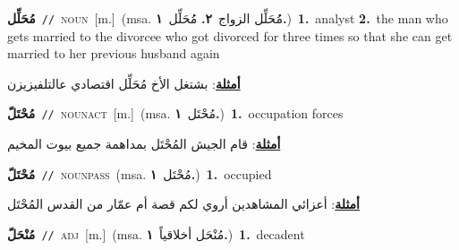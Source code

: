 \documentclass[10pt,a4paper,twoside]{article} %
\begin{document}
\begin{multicols}{2}
{\setlength\topsep{0pt}\textbf{\foreignlanguage{arabic}{مُحَلِّل}}\ {\color{gray}\texttt{//}\color{black}}\ \textsc{noun}\ [m.]\ \color{gray}(msa. \foreignlanguage{arabic}{مُُحَلِّل الزواج}~\foreignlanguage{arabic}{\textbf{٢.}}  \foreignlanguage{arabic}{مُُحَلِّل}~\foreignlanguage{arabic}{\textbf{١.}})\color{black}\ \textbf{1.}~analyst  \textbf{2.}~the man who gets married to the divorcee who got divorced for three times so that she can get married to her previous husband again\  \begin{flushright}\color{gray}\foreignlanguage{arabic}{\textbf{\underline{\foreignlanguage{arabic}{أمثلة}}}: بشتغل الأخ مُحَلِّل اقتصادي عالتلفيزيزن}\end{flushright}\color{black}} \vspace{2mm}

{\setlength\topsep{0pt}\textbf{\foreignlanguage{arabic}{مُحْتَلّ}}\ {\color{gray}\texttt{//}\color{black}}\ \textsc{noun\textunderscore act}\ [m.]\ \color{gray}(msa. \foreignlanguage{arabic}{مُحْتَل}~\foreignlanguage{arabic}{\textbf{١.}})\color{black}\ \textbf{1.}~occupation forces\  \begin{flushright}\color{gray}\foreignlanguage{arabic}{\textbf{\underline{\foreignlanguage{arabic}{أمثلة}}}: قام الجيش المُحْتَل بمداهمة جميع بيوت المخيم}\end{flushright}\color{black}} \vspace{2mm}

{\setlength\topsep{0pt}\textbf{\foreignlanguage{arabic}{مُحْتَلّ}}\ {\color{gray}\texttt{//}\color{black}}\ \textsc{noun\textunderscore pass}\ \color{gray}(msa. \foreignlanguage{arabic}{مُحْتَل}~\foreignlanguage{arabic}{\textbf{١.}})\color{black}\ \textbf{1.}~occupied\  \begin{flushright}\color{gray}\foreignlanguage{arabic}{\textbf{\underline{\foreignlanguage{arabic}{أمثلة}}}: أعزائي المشاهدين أروي لكم قصة أم عمّار من القدس المُحْتَل}\end{flushright}\color{black}} \vspace{2mm}

{\setlength\topsep{0pt}\textbf{\foreignlanguage{arabic}{مُنْحَلّ}}\ {\color{gray}\texttt{//}\color{black}}\ \textsc{adj}\ [m.]\ \color{gray}(msa. \foreignlanguage{arabic}{مُنْحَل أخلاقياً}~\foreignlanguage{arabic}{\textbf{١.}})\color{black}\ \textbf{1.}~decadent\ } \vspace{2mm}


\end{multicols}
\end{document}
